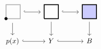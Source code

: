 \begin{center}
    \(
    \begin{tikzcd}
    \begin{tikzpicture}[x=2em, y=2em, baseline=0.7em]
        \draw[very thick, black!30] (0,0)--(1,0)--(1,1)--(0,1)--(0,0);
        \filldraw (0,0) circle (2pt);
    \end{tikzpicture}
    \ar[r, hook]\ar[d]
    & 
    \begin{tikzpicture}[x=2em, y=2em, baseline=0.7em]
        \draw[very thick] (0,0)--(1,0)--(1,1)--(0,1)--(0,0);
    \end{tikzpicture} 
    \ar[r, hook]\ar[d]
    &
    \begin{tikzpicture}[x=2em, y=2em, baseline=0.7em]
        \filldraw[very thick, fill=blue!20] (0,0)--(1,0)--(1,1)--(0,1)--(0,0);
    \end{tikzpicture}
    \ar[d]\\
    p(x)\ar[r, hook]&Y\ar[r, hook]&B
    \end{tikzcd}
    \)
\end{center}
